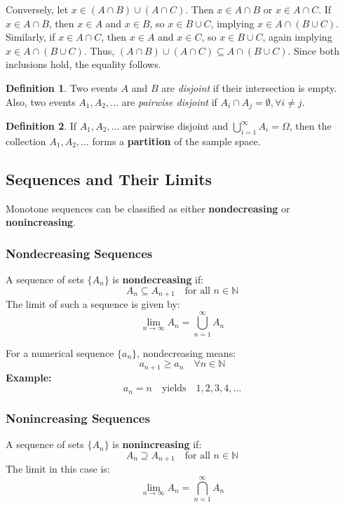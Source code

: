 \documentclass[12pt]{book}
\theoremstyle{definition}
\newtheorem{definition}{Definition}[section]
\begin{document}
Conversely, let \( x \in (A \cap B) \cup (A \cap C) \). Then \( x \in A \cap B \) or \( x \in A \cap C \). If \( x \in A \cap B \), then \( x \in A \) and \( x \in B \), so \( x \in B \cup C \), implying \( x \in A \cap (B \cup C) \). Similarly, if \( x \in A \cap C \), then \( x \in A \) and \( x \in C \), so \( x \in B \cup C \), again implying \( x \in A \cap (B \cup C) \). Thus, \( (A \cap B) \cup (A \cap C) \subseteq A \cap (B \cup C) \). Since both inclusions hold, the equality follows.

\begin{definition}
    Two events $A$ and $B$ are \textit{disjoint} if their intersection is empty. Also, two events $A_1, A_2, \dots$ are \textit{pairwise disjoint} if $A_i \cap A_j = \emptyset, \forall i \neq j$.
\end{definition}

\begin{definition}
    If $A_1, A_2, \dots$ are pairwise disjoint and $\bigcup_{i = 1}^{\infty} A_i = \Omega$, then the collection $A_1, A_2, \dots$ forms a \textbf{partition} of the sample space.
\end{definition}

\subsection{Sequences and Their Limits}
Monotone sequences can be classified as either \textbf{nondecreasing} or \textbf{nonincreasing}.

\subsubsection{Nondecreasing Sequences}
A sequence of sets $\{A_n\}$ is \textbf{nondecreasing} if:
\[
A_n \subseteq A_{n+1} \quad \text{for all } n \in \mathbb{N}
\]
The limit of such a sequence is given by:
\[
\lim_{n \to \infty} A_n = \bigcup_{n=1}^{\infty} A_n
\]

For a numerical sequence $\{a_n\}$, nondecreasing means:
\[
a_{n+1} \geq a_n \quad \forall n \in \mathbb{N}
\]
\textbf{Example:}
\[
a_n = n \quad \text{yields} \quad 1, 2, 3, 4, \dots
\]

\subsubsection{Nonincreasing Sequences}
A sequence of sets $\{A_n\}$ is \textbf{nonincreasing} if:
\[
A_n \supseteq A_{n+1} \quad \text{for all } n \in \mathbb{N}
\]
The limit in this case is:
\[
\lim_{n \to \infty} A_n = \bigcap_{n=1}^{\infty} A_n
\]
\end{document}
